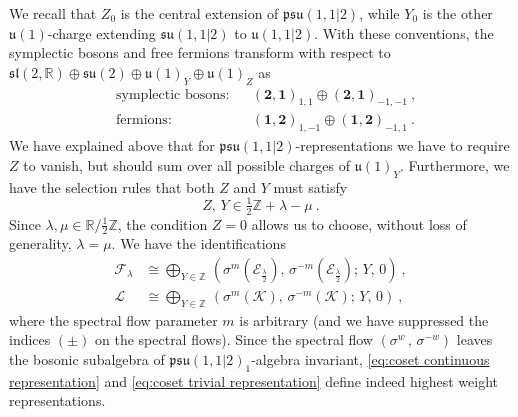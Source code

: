 \documentclass[12pt,a4paper]{article}
\newcommand{\be}{\begin{equation}}
\newcommand{\ee}{\end{equation}}
\begin{document}
We recall that $Z_0$ is the central extension of $\mathfrak{psu}(1,1|2)$, while $Y_0$ is the other $\mathfrak{u}(1)$-charge extending $\mathfrak{su}(1,1|2)$ to $\mathfrak{u}(1,1|2)$.
With these conventions, the symplectic bosons and free fermions transform 
with respect to $\mathfrak{sl}(2,\mathds{R}) \oplus \mathfrak{su}(2) \oplus \mathfrak{u}(1)_Y \oplus \mathfrak{u}(1)_Z$ as
\begin{align}
&\text{symplectic bosons}: & &(\mathbf{2},\mathbf{1})_{1,1} \oplus (\mathbf{2},\mathbf{1})_{-1,-1}\ , \label{eq:symplectic boson charges}\\
&\text{fermions}: & &(\mathbf{1},\mathbf{2})_{1,-1} \oplus (\mathbf{1},\mathbf{2})_{-1,1}\ . \label{eq:fermion charges}
\end{align}
We have explained above that for $\mathfrak{psu}(1,1|2)$-representations we have to require $Z$ to vanish, but should sum over all possible charges of $\mathfrak{u}(1)_Y$.
Furthermore, we have the selection rules that both $Z$ and $Y$ must satisfy
\be 
Z,\, Y \in \tfrac{1}{2}\mathds{Z}+\lambda-\mu\ .
\ee
Since $\lambda,\mu \in \mathds{R}/\tfrac{1}{2}\mathds{Z}$, the condition $Z=0$ allows us to choose, without loss of generality, $\lambda=\mu$. We have the identifications 
\begin{subequations}
\begin{align} 
\mathscr{F}_\lambda & \cong \bigoplus_{Y \in \mathds{Z}}\, (\sigma^{m}(\mathscr{E}_{\frac{\lambda}{2}}),\, \sigma^{-m}(\mathscr{E}_{\frac{\lambda}{2}});\, Y,\, 0)\ ,  \label{eq:coset continuous representation} \\
\mathscr{L} & \cong \bigoplus_{Y \in \mathds{Z}}\, (\sigma^m(\mathscr{K}),\, \sigma^{-m}(\mathscr{K});\, Y,\, 0)  \ , \label{eq:coset trivial representation}
\end{align}
\end{subequations}
where the spectral flow parameter $m$ is arbitrary (and we have suppressed the indices $(\pm)$ on the spectral flows). Since the spectral flow $(\sigma^{w}\, ,\, \sigma^{-w})$ leaves the bosonic subalgebra of $\mathfrak{psu}(1,1|2)_1$-algebra invariant, \eqref{eq:coset continuous representation} and \eqref{eq:coset trivial representation} define indeed highest weight representations.
\end{document}
